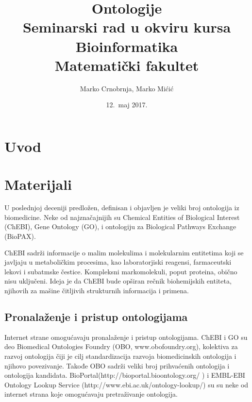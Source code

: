 \documentclass[a4paper]{article}
\begin{document}
\title{Ontologije \\ \small{Seminarski rad u okviru kursa\\Bioinformatika\\ Matematički fakultet}}

\author{Marko Crnobrnja, Marko Mićić}
\date{12.~maj 2017.}
\maketitle

\abstract{}


\newpage
\tableofcontents

\newpage

\section{Uvod}
\label{sec:uvod}

\section{Materijali}

U poslednjoj deceniji predložen, definisan i objavljen je veliki broj ontologija iz biomedicine.
Neke od najznačajnijih su Chemical Entities of Biological Interest (ChEBI), Gene Ontology (GO), 
i ontologiju za Biological Pathways Exchange (BioPAX). \par
 ChEBI sadrži informacije o malim molekulima i molekularnim entitetima 
koji se javljaju u metaboličkim procesima, kao laboratorjiski reagensi, farmaceutski lekovi i subatmske čestice.
 Kompleksni markomolekuli, poput proteina, obično nisu uključeni. Ideja je da ChEBI bude opširan rečnik biohemijskih entiteta, njihovih
za mašine čitljivih strukturnih informacija i primena.

\subsection{Pronalaženje i pristup ontologijama}

Internet strane omogućavaju pronalaženje i pristup ontologijama. ChEBI i GO su deo Biomedical Ontologies Foundry (OBO, www.obofoundry.org),
 kolektiva za razvoj ontologija čiji je cilj standardizacija razvoja biomedicinskih ontologija i njihovo povezivanje. 
Takođe OBO sadrži veliki broj prihvaćenih ontologija i ontologija kandidata.
BioPortal(http://bioportal.bioontology.org/ ) i EMBL-EBI Ontology Lookup Service (http://www.ebi.ac.uk/ontology-lookup/)
su su neke od internet strana koje omogućavaju pretraživanje ontologija.
\end{document}
